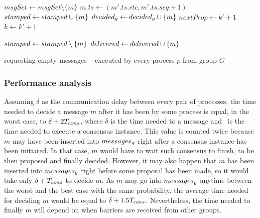 \documentclass[times, 10pt]{article}
\begin{document}
\begin{algorithm}
\begin{distribalgo}[1]
\blankline
{}
    \STATE $msgSet \leftarrow msgSet \setminus \{m\}$
      \STATE $m.ts \leftarrow (m'.ts.rtc, m'.ts.seq + 1)$ \label{algline:chgts}
    \ENDIF     
     \label{algline:checkcons}
      \STATE $stamped \leftarrow stamped \cup \{m\}$
    \ENDIF
    \STATE $decided\text{$_g$} \leftarrow decided\text{$_g$} \cup \{m\}$
      \STATE {} \label{algline:barreq} 
    \ELSE
      \STATE {} 
    \ENDIF
  \ENDINDENT
  \STATE $nextProp \leftarrow k' + 1$
  \STATE $k \leftarrow k' + 1$
\ENDINDENT

\blankline
{}
  \STATE $stamped \leftarrow stamped \setminus \{m\}$
    \STATE {}
  \ENDIF
  \STATE $delivered \leftarrow delivered \cup \{m\}$

\blankline
\ENDINDENT

\caption{ requesting empty messages -- executed by every process $p$ from group $G$}
\label{algorithm:nullondemand}
\end{distribalgo}
\end{algorithm}
 
 \subsubsection{Performance analysis}
 
 Assuming $\delta$ as the communication delay between every pair of processes, the time needed to decide a message $m$ after it has been \amcast{} by some process is equal, in the worst case, to $\delta + 2T_{cons}$, where $\delta$ is the time needed to \rmdel{} a message and \tcons\ is the time needed to execute a consensus instance. This value is counted twice because $m$ may have been inserted into $messages\text{$_g$}$ right after a consensus instance has been initiated. In that case, $m$ would have to wait such consensus to finish, to be then proposed and finally decided. However, it may also happen that $m$ has been inserted into $messages\text{$_g$}$ right before some proposal has been made, so it would take only $\delta + T_{cons}$ to decide $m$. As $m$ may go into $messages\text{$_g$}$ anytime between the worst and the best case with the same probability, the average time needed for deciding $m$ would be equal to $\delta + 1.5T_{cons}$. Nevertheless, the time needed to finally \cons{} $m$ will depend on when barriers are received from other groups.
\end{document}

